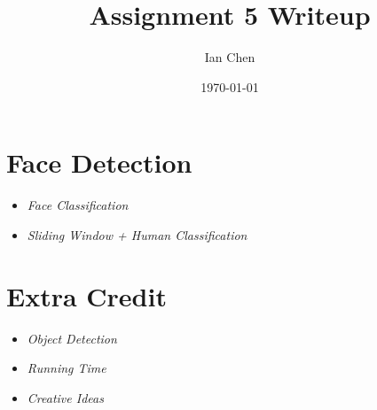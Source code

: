 \documentclass[11pt]{article}
\title{Assignment 5 Writeup}
\author{Ian Chen}
\date{\today}
\begin{document}
    \maketitle

    \section{Face Detection}
    
    \begin{itemize}
    \item \textit{Face Classification}

    \item \textit{Sliding Window + Human Classification}

    \end{itemize}

    \section{Extra Credit}

    \begin{itemize}
    \item \textit{Object Detection}

    \item \textit{Running Time}

    \item \textit{Creative Ideas}

    \end{itemize}
\end{document}
